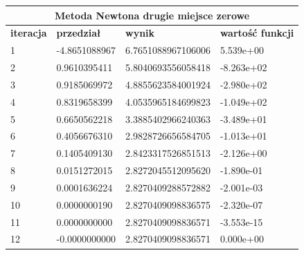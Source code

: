 \documentclass[a4paper, 11pt]{article}
\begin{document}
\begin{table}[H]
\centering
\label{my-label}
\begin{tabular}{llll}
\hline
\multicolumn{4}{c}{\textbf{Metoda Newtona drugie miejsce zerowe}} \\ \hline
\multicolumn{1}{|l|}{\textbf{iteracja}} & \multicolumn{1}{l|}{\textbf{przedział}} & \multicolumn{1}{l|}{\textbf{wynik}} & \multicolumn{1}{l|}{\textbf{wartość funkcji}} \\ \hline
\multicolumn{1}{|l|}{1} & \multicolumn{1}{l|}{-4.8651088967} & \multicolumn{1}{l|}{6.7651088967106006} & \multicolumn{1}{l|}{5.539e+00} \\ \hline
\multicolumn{1}{|l|}{2} & \multicolumn{1}{l|}{0.9610395411} & \multicolumn{1}{l|}{5.8040693556058418} & \multicolumn{1}{l|}{-8.263e+02} \\ \hline
\multicolumn{1}{|l|}{3} & \multicolumn{1}{l|}{0.9185069972} & \multicolumn{1}{l|}{4.8855623584001924} & \multicolumn{1}{l|}{-2.980e+02} \\ \hline
\multicolumn{1}{|l|}{4} & \multicolumn{1}{l|}{0.8319658399} & \multicolumn{1}{l|}{4.0535965184699823} & \multicolumn{1}{l|}{-1.049e+02} \\ \hline
\multicolumn{1}{|l|}{5} & \multicolumn{1}{l|}{0.6650562218} & \multicolumn{1}{l|}{3.3885402966240363} & \multicolumn{1}{l|}{-3.489e+01} \\ \hline
\multicolumn{1}{|l|}{6} & \multicolumn{1}{l|}{0.4056676310} & \multicolumn{1}{l|}{2.9828726656584705} & \multicolumn{1}{l|}{-1.013e+01} \\ \hline
\multicolumn{1}{|l|}{7} & \multicolumn{1}{l|}{0.1405409130} & \multicolumn{1}{l|}{2.8423317526851513} & \multicolumn{1}{l|}{-2.126e+00} \\ \hline
\multicolumn{1}{|l|}{8} & \multicolumn{1}{l|}{0.0151272015} & \multicolumn{1}{l|}{2.8272045512095620} & \multicolumn{1}{l|}{-1.890e-01} \\ \hline
\multicolumn{1}{|l|}{9} & \multicolumn{1}{l|}{0.0001636224} & \multicolumn{1}{l|}{2.8270409288572882} & \multicolumn{1}{l|}{-2.001e-03} \\ \hline
\multicolumn{1}{|l|}{10} & \multicolumn{1}{l|}{0.0000000190} & \multicolumn{1}{l|}{2.8270409098836575} & \multicolumn{1}{l|}{-2.320e-07} \\ \hline
\multicolumn{1}{|l|}{11} & \multicolumn{1}{l|}{0.0000000000} & \multicolumn{1}{l|}{2.8270409098836571} & \multicolumn{1}{l|}{-3.553e-15} \\ \hline
\multicolumn{1}{|l|}{12} & \multicolumn{1}{l|}{-0.0000000000} & \multicolumn{1}{l|}{2.8270409098836571} & \multicolumn{1}{l|}{0.000e+00} \\ \hline
\end{tabular}
\end{table}
\end{document}
